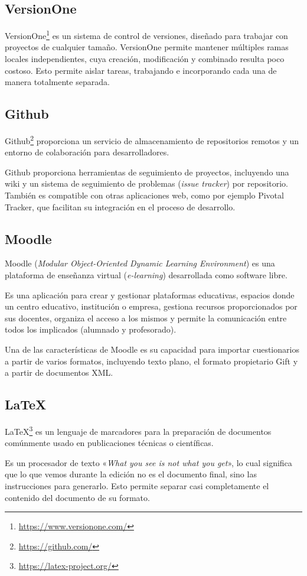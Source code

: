 \subsection{VersionOne}
VersionOne\footnote{\url{https://www.versionone.com/}} es un sistema de control de versiones, diseñado para trabajar con proyectos de cualquier tamaño.
VersionOne permite mantener múltiples ramas locales independientes, cuya creación, modificación y combinado resulta poco costoso.
Esto permite aislar tareas, trabajando e incorporando cada una de manera totalmente separada.
\subsection{Github}
Github\footnote{\url{https://github.com/}} proporciona un servicio de almacenamiento de repositorios remotos y un entorno de colaboración para desarrolladores.

Github proporciona herramientas de seguimiento de proyectos, incluyendo una wiki y un sistema de seguimiento de problemas (\emph{issue tracker}) por repositorio.
También es compatible con otras aplicaciones web, como por ejemplo Pivotal Tracker, que facilitan su integración en el proceso de desarrollo.
\subsection{Moodle }
Moodle (\emph{Modular Object-Oriented Dynamic Learning Environment}) es una plataforma de enseñanza virtual (\emph{e-learning}) desarrollada como software libre.

Es una aplicación para crear y gestionar plataformas educativas, espacios donde un centro educativo, institución o empresa, gestiona recursos proporcionados por sus docentes, organiza el acceso a los mismos y permite la comunicación entre todos los implicados (alumnado y profesorado).

Una de las características de Moodle es su capacidad para importar cuestionarios a partir de varios formatos, incluyendo texto plano, el formato propietario Gift y a partir de documentos XML.
\subsection{\LaTeX{}}
\LaTeX{}\footnote{\url{https://latex-project.org/}} es un lenguaje de marcadores para la preparación de documentos comúnmente usado en publicaciones técnicas o científicas.

Es un procesador de texto «\emph{What you see is not what you get}», lo cual significa que lo que vemos durante la edición no es el 
documento final, sino las instrucciones para generarlo.
Esto permite separar casi completamente el contenido del documento de su formato.

